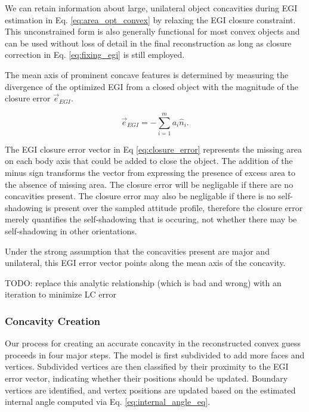 We can retain information about large, unilateral object concavities during  EGI estimation in Eq. \ref{eq:area_opt_convex} by relaxing the EGI closure constraint. This unconstrained form is also generally functional for most convex objects and can be used without loss of detail in the final reconstruction as long as closure correction in Eq. \ref{eq:fixing_egi} is still employed.

The mean axis of prominent concave features is determined by measuring the divergence of the optimized EGI from a closed object with the magnitude of the closure error $\vec{e}_{EGI}$.

\begin{equation} \label{eq:closure_error}
  \vec{e}_{EGI} = -\sum_{i=1}^{m} a_i \hat{n}_i.
\end{equation}

The EGI closure error vector in Eq \ref{eq:closure_error} represents the missing area on each body axis that could be added to close the object. The addition of the minus sign transforms the vector from expressing the presence of excess area to the absence of missing area. The closure error will be negligable if there are no concavities present. The closure error may also be negligable if there is no self-shadowing is present over the sampled attitude profile, therefore the closure error merely quantifies the self-shadowing that is occuring, not whether there may be self-shadowing in other orientations.

Under the strong assumption that the concavities present are major and unilateral, this EGI error vector points along the mean axis of the concavity.

TODO: replace this analytic relationship (which is bad and wrong) with an iteration to minimize LC error

\subsubsection{Concavity Creation}

Our process for creating an accurate concavity in the reconstructed convex guess proceeds in four major steps. The model is first subdivided to add more faces and vertices. Subdivided vertices are then classified by their proximity to the EGI error vector, indicating whether their positions should be updated. Boundary vertices are identified, and vertex positions are updated based on the estimated internal angle computed via Eq. \ref{eq:internal_angle_eq}.

